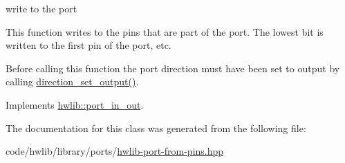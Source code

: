 write to the port

This function writes to the pins that are part of the port. The lowest bit is written to the first pin of the port, etc.

Before calling this function the port direction must have been set to output by calling \hyperlink{classhwlib_1_1port__in__out__from__pins__t_a2fb1966c582d06ecaa8ba67ab6fe2be0}{direction\+\_\+set\+\_\+output()}. 

Implements \hyperlink{classhwlib_1_1port__in__out_a0019c1f35d6f7b1d3ace6b22da86ecec}{hwlib\+::port\+\_\+in\+\_\+out}.



The documentation for this class was generated from the following file\+:\begin{DoxyCompactItemize}
\item 
code/hwlib/library/ports/\hyperlink{hwlib-port-from-pins_8hpp}{hwlib-\/port-\/from-\/pins.\+hpp}\end{DoxyCompactItemize}
